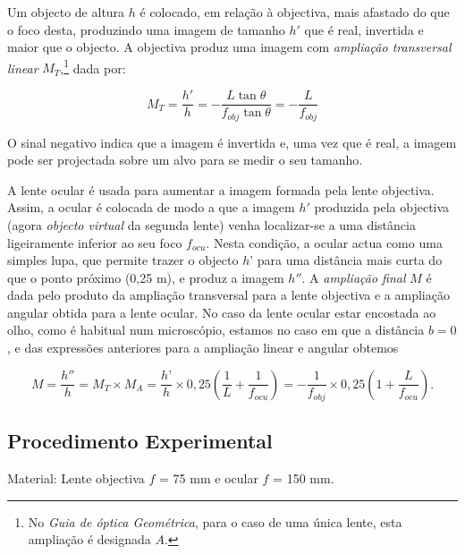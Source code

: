 \documentclass[a4paper,12pt]{article}      %
\begin{document}
Um objecto de altura $h$ é colocado, em relação à objectiva, mais afastado do que o foco desta, produzindo uma imagem de tamanho $h'$ que é real, invertida e maior que o objecto. A objectiva produz uma imagem com \emph{ampliação transversal linear} $M_T$,\footnote{No \textit{Guia de óptica Geométrica}, para o caso de uma única lente, esta ampliação é designada $A$.} dada por:

\begin{equation}
M_T=\frac{h'}{h} = -\frac{L\tan\theta}{f_{obj}\tan\theta}= -\frac{L}{f_{obj}}
\end{equation}

O sinal negativo indica que a imagem é invertida e, uma vez que é real, a imagem pode ser projectada sobre um alvo para se medir o seu tamanho.

A lente ocular é usada para aumentar a imagem formada pela lente objectiva. Assim, a ocular é colocada de modo a que a imagem $h'$ produzida pela objectiva (agora \emph{objecto virtual} da segunda lente) venha localizar-se a uma distância ligeiramente inferior ao seu foco $f_{ocu}$. Nesta condição, a ocular actua como uma simples lupa, que permite trazer o objecto $h’$ para uma distância mais curta do que o ponto próximo (0,25 m), e produz a imagem $h''$. A \emph{ampliação final} $M$ é dada pelo produto da ampliação transversal para a lente objectiva e a ampliação angular obtida para a lente ocular. No caso da lente ocular estar encostada ao olho, como é habitual num microscópio, estamos no caso em que a distância $b=0$, e das expressões anteriores para a ampliação linear e angular obtemos

\begin{equation}
M = \frac{h''}{h}=M_T\times M_A =\frac{h’}{h}\times0,25\left(\frac{1}{L}+\frac{1}{f_{ocu}}\right)=-\frac{1}{f_{obj}}\times0,25\left(1+\frac{L}{f_{ocu}}\right).
\end{equation}


\subsection{\sf Procedimento Experimental}

Material: Lente objectiva $f$ = 75 mm e ocular $f$ = 150 mm.
\end{document}
